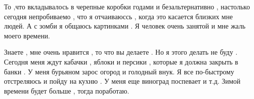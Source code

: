  
 
 
 
 


То ,что вкладывалось в черепные коробки годами и безальтернативно , настолько
сегодня непробиваемо , что я отчаиваюссь , когда это касается близких мне
людей. А с зомби я общаюсь картинками . Я человек очень занятой и мне жаль
моего времени.

Знаете , мне очень нравится , то что вы делаете . Но я этого делать не буду .
Сегодня меня ждут кабачки , яблоки и персики , которые я должна закрыть в банки
. У меня бурьяном зарос огород и голодный внук. Я все по-быстрому отстреляюсь и
пойду на кухню . У меня еще виноград поспевает и т.д. Зимой времени будет
больше , тогда поработаю.
